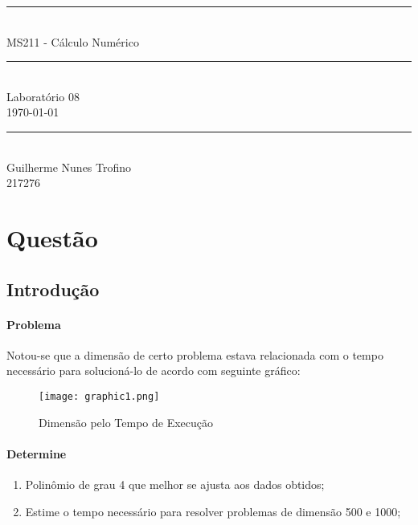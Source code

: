 \documentclass{article}
\begin{document}
    \begin{titlepage}
        \begin{center}
            \rule{450pt}{0.5pt}\\[4mm]
            {\Huge MS211 - Cálculo Numérico}\\
            \rule{450pt}{0.5pt}\\[2mm]
            {\Large Laboratório 08}\\[200mm]
            \today\\
            \rule{250pt}{0.5pt}\\
            {\large Guilherme Nunes Trofino}\\
            {\large 217276}\\
        \end{center}
    \end{titlepage}
\newpage

    \section{Questão}
        \subsection{Introdução}
            \paragraph{Problema}Notou-se que a dimensão de certo problema estava relacionada com o tempo necessário para solucioná-lo de acordo com seguinte gráfico:
                \begin{figure}[h]
                    \texttt{[image: graphic1.png]}
                    \centering
                    \caption{Dimensão pelo Tempo de Execução}
                \end{figure}

            \paragraph{Determine}
                \begin{enumerate}[noitemsep]
                    \item Polinômio de grau 4 que melhor se ajusta aos dados obtidos; 
                    \item Estime o tempo necessário para resolver problemas de dimensão 500 e 1000;
                \end{enumerate}
\end{document}
